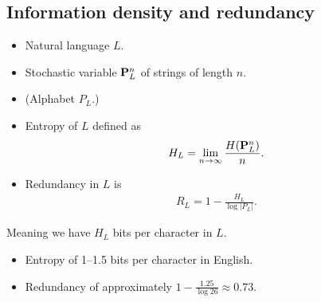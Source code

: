 \subsection{Information density and redundancy}

\begin{frame}
  \begin{definition}
    \begin{itemize}
      \item Natural language \(L\).
      \item Stochastic variable \(\mathbf P^n_L\) of strings of length \(n\).
      \item (Alphabet \(P_L\).)
      \item Entropy of \(L\) defined as
        \begin{align*}
          H_L = \lim_{n\to \infty}\frac{H(\mathbf P^n_L)}{n}.
        \end{align*}
      \item Redundancy in \(L\) is
        \begin{align*}
          R_L = 1 - \frac{H_L}{\log |P_L|}.
        \end{align*}
    \end{itemize}
  \end{definition}
\end{frame}

\begin{frame}
  \begin{remark}
    Meaning we have \(H_L\) bits per character in \(L\).
  \end{remark}

  \begin{example}
    \begin{itemize}
      \item Entropy of 1--1.5 bits per character in English.
      \item Redundancy of approximately \(1 - \frac{1.25}{\log 26} \approx 
          0.73\).
    \end{itemize}
  \end{example}

\end{frame}

